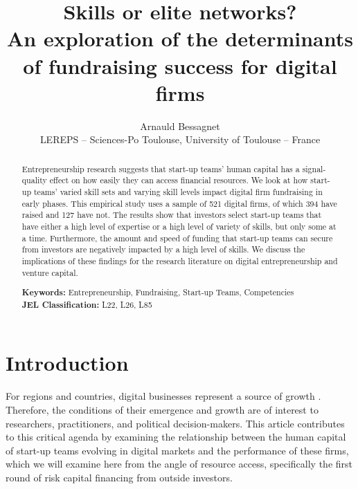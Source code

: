 \documentclass[12pt]{article}
\begin{document}
\title{Skills or elite networks? \\ An exploration of the determinants of fundraising success for digital firms}
\date{\vspace{-3ex}}
\author{Arnauld Bessagnet \\ \footnotesize{LEREPS – Sciences-Po Toulouse, University of Toulouse – France} \\}

\maketitle \vspace{-1,5em}

\begin{abstract}
\noindent
Entrepreneurship research suggests that start-up teams' human capital has a signal-quality effect on how easily they can access financial resources. We look at how start-up teams' varied skill sets and varying skill levels impact digital firm fundraising in early phases. This empirical study uses a sample of 521 digital firms, of which 394 have raised and 127 have not. The results show that investors select start-up teams that have either a high level of expertise or a high level of variety of skills, but only some at a time. Furthermore, the amount and speed of funding that start-up teams can secure from investors are negatively impacted by a high level of skills. We discuss the implications of these findings for the research literature on digital entrepreneurship and venture capital.\newline

\begin{obeylines}
\noindent \footnotesize{}{\textbf{Keywords:} Entrepreneurship, Fundraising, Start-up Teams, Competencies}
\noindent \footnotesize{\textbf{JEL Classification:} L22, L26, L85}
\end{obeylines}

\end{abstract}

\clearpage
\section{Introduction}

For regions and countries, digital businesses represent a source of growth \citep{autio2016entrepreneurship}. Therefore, the conditions of their emergence and growth are of interest to researchers, practitioners, and political decision-makers. This article contributes to this critical agenda by examining the relationship between the human capital of start-up teams evolving in digital markets and the performance of these firms, which we will examine here from the angle of resource access, specifically the first round of risk capital financing from outside investors.
\end{document}
